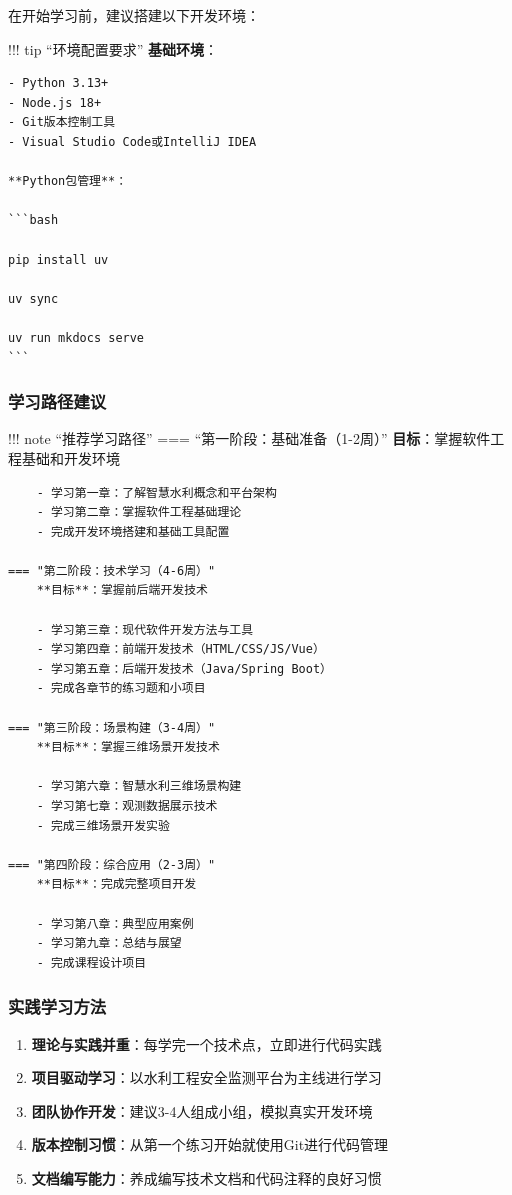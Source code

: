 在开始学习前，建议搭建以下开发环境：

!!! tip ``环境配置要求'' \textbf{基础环境}：

\begin{verbatim}
- Python 3.13+ 
- Node.js 18+
- Git版本控制工具
- Visual Studio Code或IntelliJ IDEA

**Python包管理**：

```bash

pip install uv

uv sync

uv run mkdocs serve
```
\end{verbatim}

\subsubsection{学习路径建议}\label{ux5b66ux4e60ux8defux5f84ux5efaux8bae}

!!! note ``推荐学习路径'' === ``第一阶段：基础准备（1-2周）'' \textbf{目标}：掌握软件工程基础和开发环境

\begin{verbatim}
    - 学习第一章：了解智慧水利概念和平台架构
    - 学习第二章：掌握软件工程基础理论
    - 完成开发环境搭建和基础工具配置
    
=== "第二阶段：技术学习（4-6周）"  
    **目标**：掌握前后端开发技术
    
    - 学习第三章：现代软件开发方法与工具
    - 学习第四章：前端开发技术（HTML/CSS/JS/Vue）
    - 学习第五章：后端开发技术（Java/Spring Boot）
    - 完成各章节的练习题和小项目
    
=== "第三阶段：场景构建（3-4周）"
    **目标**：掌握三维场景开发技术
    
    - 学习第六章：智慧水利三维场景构建
    - 学习第七章：观测数据展示技术
    - 完成三维场景开发实验
    
=== "第四阶段：综合应用（2-3周）"
    **目标**：完成完整项目开发
    
    - 学习第八章：典型应用案例
    - 学习第九章：总结与展望
    - 完成课程设计项目
\end{verbatim}

\subsubsection{实践学习方法}\label{ux5b9eux8df5ux5b66ux4e60ux65b9ux6cd5}

\begin{enumerate}
\def\labelenumi{\arabic{enumi}.}
\tightlist
\item
  \textbf{理论与实践并重}：每学完一个技术点，立即进行代码实践
\item
  \textbf{项目驱动学习}：以水利工程安全监测平台为主线进行学习
\item
  \textbf{团队协作开发}：建议3-4人组成小组，模拟真实开发环境
\item
  \textbf{版本控制习惯}：从第一个练习开始就使用Git进行代码管理
\item
  \textbf{文档编写能力}：养成编写技术文档和代码注释的良好习惯
\end{enumerate}

